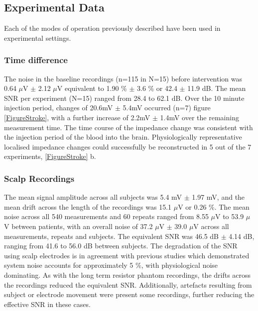 \subsection{Experimental Data}

Each of the modes of operation previously described have been used in experimental settings. 

\subsubsection{Time difference}
The noise in the baseline recordings (n=115 in N=15) before intervention was 0.64 $\mu$V $\pm$ 2.12 $\mu$V equivalent to 1.90 \% $\pm$ 3.6 \% or 42.4 $\pm$ 11.9 dB. The mean SNR per experiment (N=15) ranged from 28.4 to 62.1 dB. Over the 10 minute injection period, changes of 20.6mV \(\pm\) 5.4mV occurred (n=7) figure \ref{FigureStroke}, with a further increase of 2.2mV \(\pm\) 1.4mV over the remaining measurement time. The time course of the impedance change was consistent with the injection period of the blood into the brain. Physiologically representative localised impedance changes could successfully be reconstructed in 5 out of the 7 experiments, \ref{FigureStroke} b. 


\subsubsection{Scalp Recordings}
The mean signal amplitude across all subjects was 5.4 mV $\pm$ 1.97 mV, and the mean drift across the length of the recordings was 15.1 $\mu$V or 0.26 \%. The mean noise across all 540 measurements and 60 repeats ranged from 8.55 $\mu$V to 53.9 $\mu$V between patients, with an overall noise of 37.2  $\mu$V $\pm$ 39.0 $\mu$V across all measurements, repeats and subjects. The equivalent SNR was 46.5 dB $\pm$ 4.14 dB, ranging from 41.6 to 56.0 dB between subjects. The degradation of the SNR using scalp electrodes is in agreement with previous studies \cite{fabrizi2007analysis} which demonstrated system noise accounts for approximately 5 \%, with physiological noise dominating. As with the long term resistor phantom recordings, the drifts across the recordings reduced the equivalent SNR. Additionally, artefacts resulting from subject or electrode movement were present some recordings, further reducing the effective SNR in these cases.  


